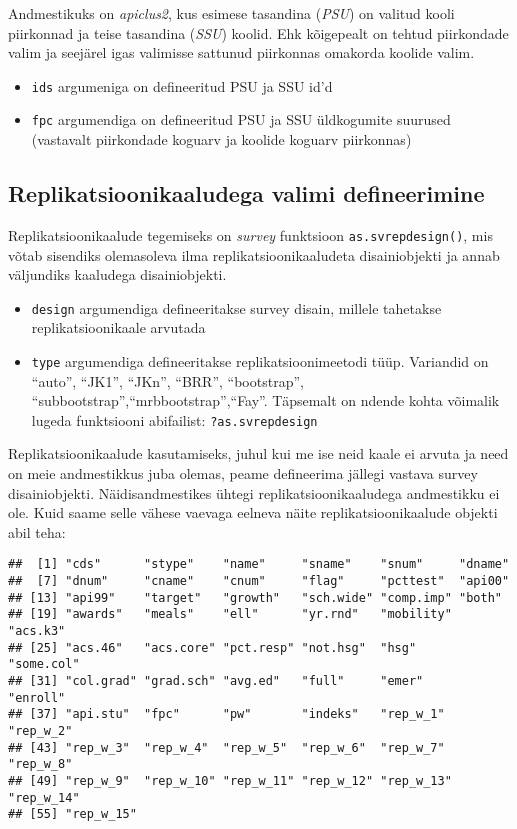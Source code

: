 \documentclass[
]{book}
\providecommand{\tightlist}{%
  \setlength{\itemsep}{0pt}\setlength{\parskip}{0pt}}
\begin{document}
Andmestikuks on \emph{apiclus2}, kus esimese tasandina (\emph{PSU}) on valitud kooli piirkonnad ja teise tasandina (\emph{SSU}) koolid. Ehk kõigepealt on tehtud piirkondade valim ja seejärel igas valimisse sattunud piirkonnas omakorda koolide valim.

\begin{itemize}
\tightlist
\item
  \texttt{ids} argumeniga on defineeritud PSU ja SSU id'd
\item
  \texttt{fpc} argumendiga on defineeritud PSU ja SSU üldkogumite suurused (vastavalt piirkondade koguarv ja koolide koguarv piirkonnas)
\end{itemize}

\hypertarget{replikatsioonikaaludega-valimi-defineerimine}{%
\subsection{Replikatsioonikaaludega valimi defineerimine}\label{replikatsioonikaaludega-valimi-defineerimine}}

Replikatsioonikaalude tegemiseks on \emph{survey} funktsioon \texttt{as.svrepdesign()}, mis võtab sisendiks olemasoleva ilma replikatsioonikaaludeta disainiobjekti ja annab väljundiks kaaludega disainiobjekti.

\begin{itemize}
\tightlist
\item
  \texttt{design} argumendiga defineeritakse survey disain, millele tahetakse replikatsioonikaale arvutada
\item
  \texttt{type} argumendiga defineeritakse replikatsioonimeetodi tüüp. Variandid on ``auto'', ``JK1'', ``JKn'', ``BRR'', ``bootstrap'', ``subbootstrap'',``mrbbootstrap'',``Fay''. Täpsemalt on ndende kohta võimalik lugeda funktsiooni abifailist: \texttt{?as.svrepdesign}
\end{itemize}

Replikatsioonikaalude kasutamiseks, juhul kui me ise neid kaale ei arvuta ja need on meie andmestikkus juba olemas, peame defineerima jällegi vastava survey disainiobjekti. Näidisandmestikes ühtegi replikatsioonikaaludega andmestikku ei ole. Kuid saame selle vähese vaevaga eelneva näite replikatsioonikaalude objekti abil teha:

\begin{verbatim}
##  [1] "cds"      "stype"    "name"     "sname"    "snum"     "dname"   
##  [7] "dnum"     "cname"    "cnum"     "flag"     "pcttest"  "api00"   
## [13] "api99"    "target"   "growth"   "sch.wide" "comp.imp" "both"    
## [19] "awards"   "meals"    "ell"      "yr.rnd"   "mobility" "acs.k3"  
## [25] "acs.46"   "acs.core" "pct.resp" "not.hsg"  "hsg"      "some.col"
## [31] "col.grad" "grad.sch" "avg.ed"   "full"     "emer"     "enroll"  
## [37] "api.stu"  "fpc"      "pw"       "indeks"   "rep_w_1"  "rep_w_2" 
## [43] "rep_w_3"  "rep_w_4"  "rep_w_5"  "rep_w_6"  "rep_w_7"  "rep_w_8" 
## [49] "rep_w_9"  "rep_w_10" "rep_w_11" "rep_w_12" "rep_w_13" "rep_w_14"
## [55] "rep_w_15"
\end{verbatim}
\end{document}
